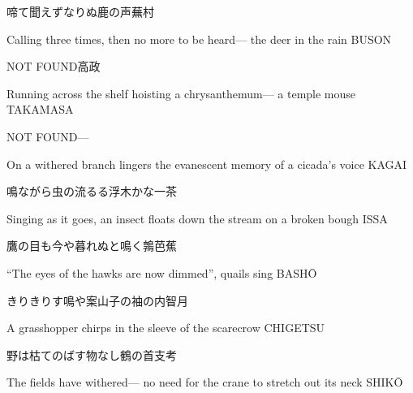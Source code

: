\begin{haiku}
    {\FH {}啼て聞えずなりぬ鹿の声}\hfill{\FH 蕪村}

    \vin{} Calling three times,
    \vin{} \vin{} then no more to be heard---
    \vin{} \vin{} \vin{} the deer in the rain \hspace{\fill} BUSON
\end{haiku}

\begin{haiku}
    NOT FOUND\hfill{\FH 高政}

    \vin{} Running across the shelf
    \vin{} \vin{} hoisting a chrysanthemum---
    \vin{} \vin{} \vin{} a temple mouse \hspace{\fill} TAKAMASA
\end{haiku}

\begin{haiku}
   NOT FOUND\hfill{---}

    \vin{} On a withered branch
    \vin{} \vin{} lingers the evanescent memory
    \vin{} \vin{} \vin{} of a cicada's voice \hspace{\fill} KAGAI
\end{haiku}

\begin{haiku}
    {\FH 鳴ながら虫の流るる浮木かな}\hfill{\FH 一茶}

    \vin{} Singing as it goes,
    \vin{} \vin{} an insect floats down the stream
    \vin{} \vin{} \vin{} on a broken bough \hspace{\fill} ISSA
\end{haiku}

\begin{haiku}
    {\FH 鷹の目も今や暮れぬと鳴く鶉}\hfill{\FH 芭蕉}

    \vin{} ``The eyes of the hawks
    \vin{} \vin{} are now dimmed'',
    \vin{} \vin{} \vin{} quails sing \hspace{\fill} BASH\={O}
\end{haiku}

\begin{haiku}
    {\FH きりきりす鳴や案山子の袖の内}\hfill{\FH 智月}

    \vin{} A grasshopper
    \vin{} \vin{} chirps in the sleeve
    \vin{} \vin{} \vin{} of the scarecrow \hspace{\fill} CHIGETSU
\end{haiku}

\begin{haiku}
    {\FH 野は枯てのばす物なし鶴の首}\hfill{\FH 支考}

    \vin{} The fields have withered---
    \vin{} \vin{} no need for the crane
    \vin{} \vin{} \vin{} to stretch out its neck \hspace{\fill} SHIK\={O}
\end{haiku}

